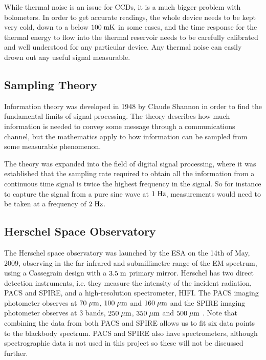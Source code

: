 While thermal noise is an issue for CCDs, it is a much bigger problem with bolometers. In order to get accurate readings, the whole device needs to be kept very cold, down to a below $100\;\mathrm{mK}$ in some cases, and the time response for the thermal energy to flow into the thermal reservoir needs to be carefully calibrated and well understood for any particular device. Any thermal noise can easily drown out any useful signal measurable.

\subsection{Sampling Theory}

Information theory was developed in 1948 by Claude Shannon \citep{shannon2001mathematical} in order to find the fundamental limits of signal processing. The theory describes how much information is needed to convey some message through a communications channel, but the mathematics apply to how information can be sampled from some measurable phenomenon.

The theory was expanded into the field of digital signal processing, where it was established that the sampling rate required to obtain all the information from a continuous time signal is twice the highest frequency in the signal. So for instance to capture the signal from a pure sine wave at $1\;\mathrm{Hz}$, measurements would need to be taken at a frequency of $2\;\mathrm{Hz}$.

\subsection{Herschel Space Observatory}

The Herschel space observatory was launched by the ESA on the 14th of May, 2009, observing in the far infrared and submillimetre range of the EM spectrum, using a Cassegrain design with a $3.5\;\mathrm{m}$ primary mirror. Herschel has two direct detection instruments, i.e. they measure the intensity of the incident radiation, PACS and SPIRE, and a high-resolution spectrometer, HIFI. The PACS imaging photometer observes at $70\;\mathrm{\mu m}$, $100\;\mathrm{\mu m}$ and $160\;\mathrm{\mu m}$ and the SPIRE imaging photometer observes at 3 bands, $250\;\mathrm{\mu m}$, $350\;\mathrm{\mu m}$ and $500\;\mathrm{\mu m}$ \citep{pilbratt2010herschel}. Note that combining the data from both PACS and SPIRE allows us to fit six data points to the blackbody spectrum. PACS and SPIRE also have spectrometers, although spectrographic data is not used in this project so these will not be discussed further.


